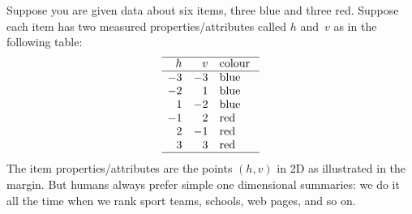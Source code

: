 \begin{example} \label{eg:toypca}
Suppose you are given data about six items, three blue and three red.
Suppose each item has two measured properties\slash attributes called \(h\) and~\(v\) as in the following table:
%
\begin{equation*}
\begin{array}{rrp{3em}}
\hline h&v&colour\\\hline
-3&-3&blue \\
-2&1&blue \\
1&-2&blue \\
-1&2&red \\
2&-1&red \\
3&3&red \\\hline
\end{array}
\end{equation*}
The item properties\slash attributes are the points \((h,v)\) in 2D as illustrated in the margin.
But humans always prefer simple one dimensional summaries: we do it all the time when we rank sport teams, schools, web pages, and so on.


\end{example}
